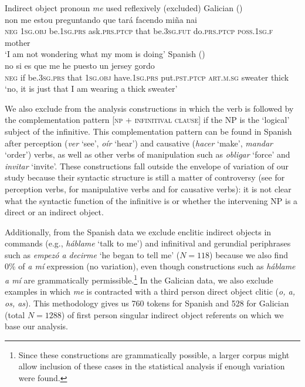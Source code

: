 \documentclass[output=paper]{langscibook}
\begin{document}
\ea%
    Indirect object pronoun \textit{me} used reflexively (excluded)\label{ex:brown:4}
    \ea  Galician ()\\
    \gll non me estou preguntando que tará facendo miña nai\\
         \textsc{neg} \textsc{1sg.obj} be.\textsc{1sg.prs} ask.\textsc{prs.ptcp} that be.\textsc{3sg.fut} do.\textsc{prs.ptcp} \textsc{poss.1sg.f} mother\\
    \glt ‘I am not wondering what my mom is doing’
    \ex Spanish ()\\
    \gll no si es que me he puesto un jersey gordo\\
         \textsc{neg} if be.\textsc{3sg.prs} that \textsc{1sg.obj} have.\textsc{1sg.prs} put.\textsc{pst.ptcp} \textsc{art.m.sg} sweater thick\\
    \glt ‘no, it is just that I am wearing a thick sweater’
    \z
\z

We also exclude from the analysis constructions in which the verb is followed by the complementation pattern [\textsc{np} + \textsc{infinitival} \textsc{clause}] if the NP is the ‘logical’ subject of the infinitive. This complementation pattern can be found in Spanish after perception (\textit{ver} ‘see’, \textit{oír} ‘hear’) and causative (\textit{hacer} ‘make’, \textit{mandar} ‘order’) verbs, as well as other verbs of manipulation such as \textit{obligar} ‘force’ and \textit{invitar} ‘invite’. These constructions fall outside the envelope of variation of our study because their syntactic structure is still a matter of controversy (see \citealt{Enghels2012} for perception verbs, \citealt{Rivas2013} for manipulative verbs and \citealt{MarchísMorenoNavarro2015} for causative verbs): it is not clear what the syntactic function of the infinitive is or whether the intervening NP is a direct or an indirect object. 

Additionally, from the Spanish data we exclude enclitic indirect objects in commands (e.g., \textit{háblame} ‘talk to me’) and infinitival and gerundial periphrases such as \textit{empezó a decirme} ‘he began to tell me’ ($N=118$) because we also find 0\% of \textit{a mí} expression (no variation), even though constructions such as \textit{háblame a mí} are grammatically permissible.\footnote{Since these constructions are grammatically possible, a larger corpus might allow inclusion of these cases in the statistical analysis if enough variation were found.}  In the Galician data, we also exclude examples in which \textit{me} is contracted with a third person direct object clitic (\textit{o, a, os, as}). This methodology gives us 760 tokens for Spanish and 528 for Galician (total $N=1288$) of first person singular indirect object referents on which we base our analysis. 
\end{document}
